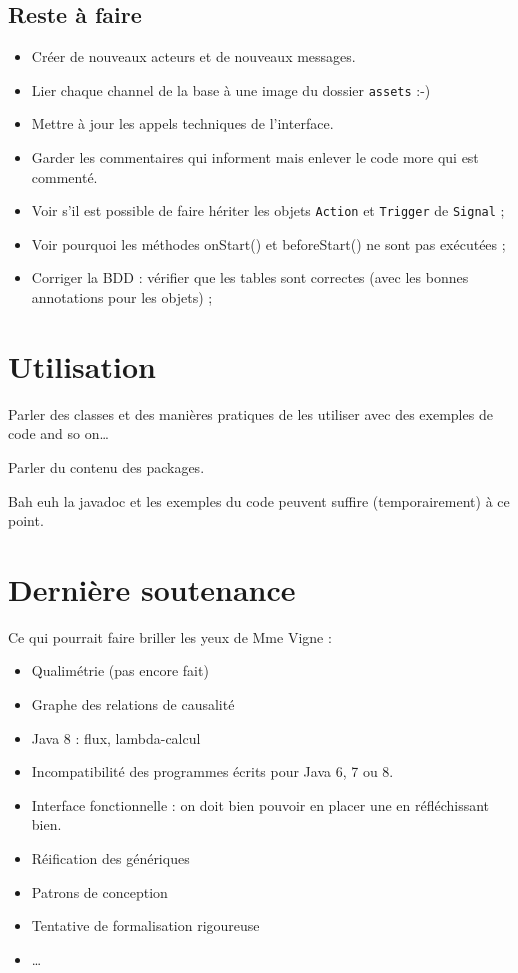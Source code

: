 \documentclass[11pt]{article}
\begin{document}
\subsection{Reste à faire}
\begin{itemize}
\item Créer de nouveaux acteurs et de nouveaux messages.
\item Lier chaque channel de la base à une image du dossier \texttt{assets} :-)
\item Mettre à jour les appels techniques de l'interface.
\item Garder les commentaires qui informent mais enlever le code more qui est commenté.
\item Voir s'il est possible de faire hériter les objets \texttt{Action} et \texttt{Trigger} de \texttt{Signal} ;
\item Voir pourquoi les méthodes onStart() et beforeStart() ne sont pas exécutées ;
\item Corriger la BDD : vérifier que les tables sont correctes (avec les bonnes annotations pour les objets) ;
\end{itemize}

\section{Utilisation}

Parler des classes et des manières \og pratiques \fg{} de les utiliser avec des exemples de code and so on\dots

Parler du contenu des packages.

Bah euh la javadoc et les exemples du code peuvent suffire (temporairement) à ce point.

\section{Dernière soutenance}

Ce qui pourrait faire briller les yeux de Mme Vigne :
\begin{itemize}
\item Qualimétrie (pas encore fait)
\item Graphe des relations de causalité
\item Java 8 : flux, lambda-calcul
\item Incompatibilité des programmes écrits pour Java 6, 7 ou 8.
\item Interface fonctionnelle : on doit bien pouvoir en placer une en réfléchissant bien.
\item Réification des génériques
\item Patrons de conception
\item Tentative de formalisation rigoureuse
\item \dots
\end{itemize}
\end{document}
